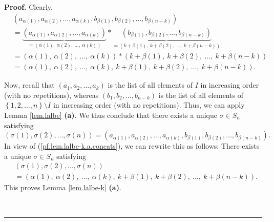 \documentclass[numbers=enddot,12pt,final,onecolumn,notitlepage,english]{scrartcl}%
\theoremstyle{definition}
\newenvironment{proof}[1][Proof]{\noindent\textbf{#1.} }{\ \rule{0.5em}{0.5em}}
\newenvironment{verlong}{}{}
\begin{document}
\begin{verlong}
\begin{proof}
Clearly,%
\begin{align}
&  \left(  a_{\alpha\left(  1\right)  },a_{\alpha\left(  2\right)  }%
,\ldots,a_{\alpha\left(  k\right)  },b_{\beta\left(  1\right)  }%
,b_{\beta\left(  2\right)  },\ldots,b_{\beta\left(  n-k\right)  }\right)
\nonumber\\
&  =\underbrace{\left(  a_{\alpha\left(  1\right)  },a_{\alpha\left(
2\right)  },\ldots,a_{\alpha\left(  k\right)  }\right)  }_{=\left(
\alpha\left(  1\right)  ,\ \alpha\left(  2\right)  ,\ \ldots,\ \alpha\left(
k\right)  \right)  }\ast\underbrace{\left(  b_{\beta\left(  1\right)
},b_{\beta\left(  2\right)  },\ldots,b_{\beta\left(  n-k\right)  }\right)
}_{=\left(  k+\beta\left(  1\right)  ,\ k+\beta\left(  2\right)
,\ \ldots,\ k+\beta\left(  n-k\right)  \right)  }\nonumber\\
&  =\left(  \alpha\left(  1\right)  ,\ \alpha\left(  2\right)  ,\ \ldots
,\ \alpha\left(  k\right)  \right)  \ast\left(  k+\beta\left(  1\right)
,\ k+\beta\left(  2\right)  ,\ \ldots,\ k+\beta\left(  n-k\right)  \right)
\nonumber\\
&  =\left(  \alpha\left(  1\right)  ,\ \alpha\left(  2\right)  ,\ \ldots
,\ \alpha\left(  k\right)  ,\ k+\beta\left(  1\right)  ,\ k+\beta\left(
2\right)  ,\ \ldots,\ k+\beta\left(  n-k\right)  \right)  .
\label{pf.lem.lalbe-k.a.concats}%
\end{align}


Now, recall that $\left(  a_{1},a_{2},\ldots,a_{k}\right)  $ is the list of
all elements of $I$ in increasing order (with no repetitions), whereas
$\left(  b_{1},b_{2},\ldots,b_{n-k}\right)  $ is the list of all elements of
$\left\{  1,2,\ldots,n\right\}  \setminus I$ in increasing order (with no
repetitions). Thus, we can apply Lemma \ref{lem.lalbe} \textbf{(a)}. We thus
conclude that there exists a unique $\sigma\in S_{n}$ satisfying%
\[
\left(  \sigma\left(  1\right)  ,\sigma\left(  2\right)  ,\ldots,\sigma\left(
n\right)  \right)  =\left(  a_{\alpha\left(  1\right)  },a_{\alpha\left(
2\right)  },\ldots,a_{\alpha\left(  k\right)  },b_{\beta\left(  1\right)
},b_{\beta\left(  2\right)  },\ldots,b_{\beta\left(  n-k\right)  }\right)  .
\]
In view of (\ref{pf.lem.lalbe-k.a.concats}), we can rewrite this as follows:
There exists a unique $\sigma\in S_{n}$ satisfying%
\begin{align*}
&  \left(  \sigma\left(  1\right)  ,\sigma\left(  2\right)  ,\ldots
,\sigma\left(  n\right)  \right) \\
&  =\left(  \alpha\left(  1\right)  ,\ \alpha\left(  2\right)  ,\ \ldots
,\ \alpha\left(  k\right)  ,\ k+\beta\left(  1\right)  ,\ k+\beta\left(
2\right)  ,\ \ldots,\ k+\beta\left(  n-k\right)  \right)  .
\end{align*}
This proves Lemma \ref{lem.lalbe-k} \textbf{(a)}. \medskip


\end{proof}
\end{verlong}
\end{document}
